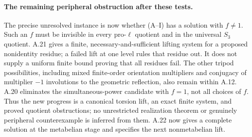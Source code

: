 \paragraph{The remaining peripheral obstruction after these tests.}
The precise unresolved instance is now whether
\textup{(A--I)} has a solution with $f\ne1$. Such an $f$
must be invisible in every pro-$\ell$ quotient and in
the universal $S_3$ quotient. A.21 gives a finite,
necessary-and-sufficient lifting system for a proposed
nonidentity residue; a failed lift at one level rules
that residue out. It does not supply a uniform finite
bound proving that all residues fail. The other
tripod possibilities, including mixed finite-order
orientation multipliers and conjugacy of multiplier
$-1$ involutions to the geometric reflection, also
remain within A.12. A.20 eliminates the simultaneous-power
candidate with $f=1$, not all choices of $f$.
Thus the new progress is a canonical torsion lift, an
exact finite system, and proved quotient obstructions;
no unrestricted realization theorem or genuinely
peripheral counterexample is inferred from them.
A.22 now gives a complete solution at the metabelian
stage and specifies the next nonmetabelian lift.

